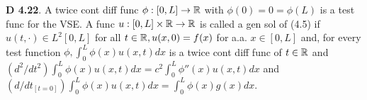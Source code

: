 {\bf D 4.22}. A twice cont diff func $\phi: [0,L] \rightarrow \mathbb{R}$ with $\phi(0)=0=\phi(L)$ is a test func for the VSE. A func $u: [0,L]\times \mathbb{R} \rightarrow \mathbb{R}$ is called a gen sol of (4.5) if $u(t, \cdot) \in L^2[0,L]$ for all $t \in \mathbb{R}, u(x,0)=f(x)$ for a.a. $x \in [0,L]$ and, for every test function $\phi, \int_0^L \phi(x)u(x,t)dx$ is a twice cont diff func of $t \in \mathbb{R}$ and $(d^2/dt^2)\int_0^L \phi(x) u(x,t) dx= c^2\int_0^L \phi''(x)u(x,t)dx$ and $(d/dt_{[t=0]})\int_0^L\phi(x)u(x,t)dx=\int_0^L\phi(x)g(x)dx$. 